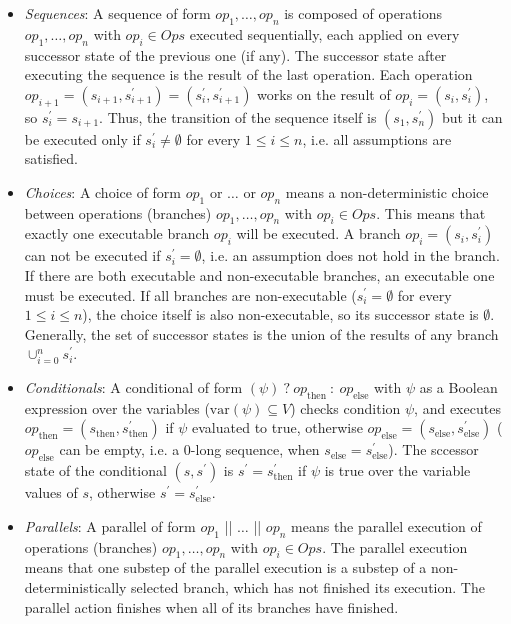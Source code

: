     \begin{itemize}
        \item \textit{Sequences}: A sequence of form $op_1, \ldots, op_n$ is composed of operations $op_1, \ldots, op_n$ with $op_i \in Ops$ executed sequentially, each applied on every successor state of the previous one (if any). The successor state after executing the sequence is the result of the last operation.
        Each operation $op_{i+1}=(s_{i+1}, s^\prime_{i+1})=(s^\prime_{i}, s^\prime_{i+1})$ works on the result of $op_i=(s_{i}, s^\prime_{i})$, so $s^\prime_{i} = s_{i+1}$. Thus, the transition of the sequence itself is $(s_{1}, s^\prime_{n})$ but it can be executed only if $s^\prime_{i} \neq \emptyset$ for every $1 \leq i \leq n$, i.e. all assumptions are satisfied.
        
        \item \textit{Choices}: A choice of form $op_1$ or $\ldots$ or $op_n$ means a non-deterministic choice between operations (branches) $op_1, \ldots, op_n$ with $op_i \in Ops$. This means that exactly one executable branch $op_i$ will be executed. A branch $op_i = (s_{i}, s^\prime_{i})$ can not be executed if $s^\prime_{i} = \emptyset$, i.e. an assumption does not hold in the branch. If there are both executable and non-executable branches, an executable one must be executed. If all branches are non-executable ($s^\prime_{i} = \emptyset$ for every $1 \leq i \leq n$), the choice itself is also non-executable, so its successor state is $\emptyset$. Generally, the set of successor states is the union of the results of any branch $\cup_{i=0}^{n} s^\prime_{i}$.
        
        \item \textit{Conditionals}: A conditional of form $(\psi)\ ?\ op_{\mathrm{then}}\ :\ op_{\mathrm{else}}$ with $\psi$ as a Boolean expression over the variables ($\mathrm{var}(\psi) \subseteq V$) checks condition $\psi$, and executes $op_{\mathrm{then}} = (s_{\mathrm{then}}, s^\prime_{\mathrm{then}})$ if $\psi$ evaluated to true, otherwise $op_{\mathrm{else}} = (s_{\mathrm{else}}, s^\prime_{\mathrm{else}})$ ($op_{\mathrm{else}}$ can be empty, i.e. a 0-long sequence, when $s_{\mathrm{else}} = s^\prime_{\mathrm{else}}$). The sccessor state of the conditional $(s, s^\prime)$ is $s^\prime = s^\prime_{\mathrm{then}}$ if $\psi$ is true over the variable values of $s$, otherwise $s^\prime = s^\prime_{\mathrm{else}}$.
        
        \item \textit{Parallels}: A parallel of form $op_1$ || $\ldots$ || $op_n$ means the parallel execution of operations (branches) $op_1, \ldots, op_n$ with $op_i \in Ops$. The parallel execution means that one substep of the parallel execution is a substep of a non-deterministically selected branch, which has not finished its execution. The parallel action finishes when all of its branches have finished.
    \end{itemize}
    
